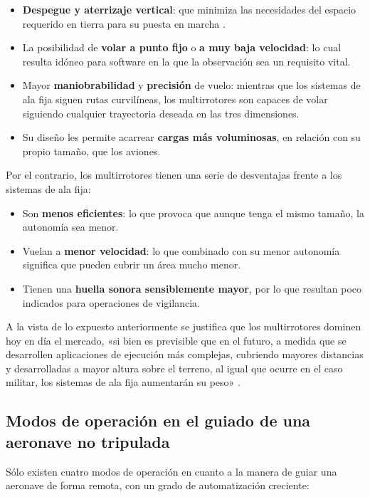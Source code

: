 \begin{itemize}
\item \textbf{Despegue y aterrizaje vertical}: que minimiza las necesidades del espacio requerido en tierra para su puesta en marcha	.
\item La posibilidad de \textbf{volar a punto fijo} o \textbf{a muy baja velocidad}: lo cual resulta idóneo para software en la que la observación sea un requisito vital.
\item Mayor \textbf{maniobrabilidad} y \textbf{precisión} de vuelo: mientras que los sistemas de ala fija siguen rutas curvilíneas, los multirrotores son capaces de volar siguiendo cualquier trayectoria deseada en las tres dimensiones.
\item Su diseño les permite acarrear \textbf{cargas más voluminosas}, en relación con su propio tamaño, que los aviones. 
\end{itemize}
Por el contrario, los multirrotores tienen una serie de desventajas frente a los sistemas de ala fija:

\begin{itemize}
\item Son \textbf{menos eficientes}: lo que provoca que aunque tenga el mismo tamaño, la autonomía sea menor.
\item Vuelan a \textbf{menor velocidad}: lo que combinado con su menor autonomía significa que pueden cubrir un área mucho menor.
\item Tienen una \textbf{huella sonora sensiblemente mayor}, por lo que resultan poco indicados para operaciones de vigilancia.
\end{itemize}

A la vista de lo expuesto anteriormente se justifica que los multirrotores dominen hoy en día el mercado, 
«si bien es previsible que en el futuro, a medida que se desarrollen aplicaciones de ejecución más complejas, cubriendo 
mayores distancias y desarrolladas a mayor altura sobre el terreno, al igual que ocurre en el caso militar, los sistemas de ala 
fija aumentarán su peso» \cite{dron2}.

\subsection{Modos de operación en el guiado de una aeronave no tripulada}
\label{sec:mododeoperacion}

Sólo existen cuatro modos de operación en cuanto a la manera de guiar una aeronave de forma remota, 
con un grado de automatización creciente:

